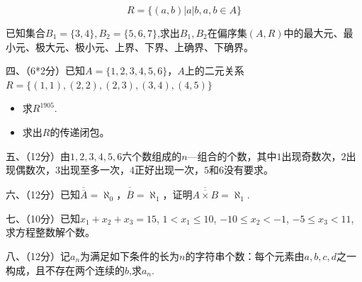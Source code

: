 \[R=\{(a,b)| a|b,a,b \in A\}\]

已知集合$B_1=\{3,4\},B_2=\{5,6,7\}$,求出$B_1,B_2$在偏序集$(A,R)$中的最大元、最小元、极大元、极小元、上界、下界、上确界、下确界。


四、（6*2分）已知$A=\{1,2,3,4,5,6\}$，$A$上的二元关系$R=\{(1,1),(2,2),(2,3),(3,4),(4,5)\}$

\begin{itemize}
    \item[(1)] 求$R^{1905}$.
    \item[(2)]求出$R$的传递闭包。
\end{itemize}

五、（12分）由$1,2,3,4,5,6$六个数组成的$n$—组合的个数，其中$1$出现奇数次，$2$出现偶数次，$3$出现至多一次，$4$正好出现一次，$5$和$6$没有要求。

六、（12分）已知$\overline{\overline{A}}=\aleph_0$，$\overline{\overline{B}}=\aleph_1$，证明$\overline{\overline{A \times B}}=\aleph_1$.

七、（10分）已知$x_1+x_2+x_3=15$, $1 < x_1 \leq 10$, $-10 \leq x_2 < -1$, $-5 \leq x_3 < 11$,求方程整数解个数。

八、（12分）记$a_n$为满足如下条件的长为$n$的字符串个数：每个元素由$a,b,c,d$之一构成，且不存在两个连续的$b$,求$a_n$.